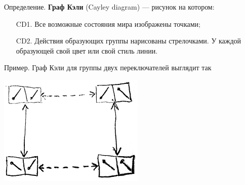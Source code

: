 \documentclass[12pt]{article} %
\begin{document}
Определение. \textbf{Граф Кэли} (Cayley diagram) — рисунок на котором:
\begin{enumerate}
  \item[CD1.] Все возможные состояния мира изображены точками;
  \item[CD2.] Действия образующих группы нарисованы стрелочками. У каждой образующей свой цвет или свой стиль линии.
\end{enumerate}

Пример. Граф Кэли для группы двух переключателей выглядит так

 \begin{minipage}[c]{\textwidth}
 \centering
         \includegraphics[width=7cm]{figure/two_switches.png}
\end{minipage}
\end{document}
